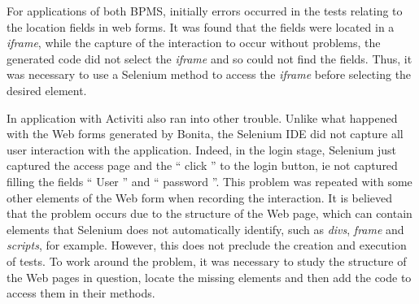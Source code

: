 \documentclass[runningheads,a4paper]{llncs}
\begin{document}
For applications of both BPMS, initially errors occurred in the tests relating to the location fields in web forms. It was found that the fields were located in a \emph{iframe}, while the capture of the interaction to occur without problems, the generated code did not select the \emph{iframe} and so could not find the fields. Thus, it was necessary to use a Selenium method to access the \emph{iframe} before selecting the desired element.


In application with Activiti also ran into other trouble. Unlike what happened with the Web forms generated by Bonita, the Selenium IDE did not capture all user interaction with the application. Indeed, in the login stage, Selenium just captured the access page and the `` click '' to the login button, ie not captured filling the fields `` User '' and `` password ''. This problem was repeated with some other elements of the Web form when recording the interaction. It is believed that the problem occurs due to the structure of the Web page, which can contain elements that Selenium does not automatically identify, such as \emph{divs}, \emph{frame} and \emph{scripts}, for example. However, this does not preclude the creation and execution of tests. To work around the problem, it was necessary to study the structure of the Web pages in question, locate the missing elements and then add the code to access them in their methods.
\end{document}
